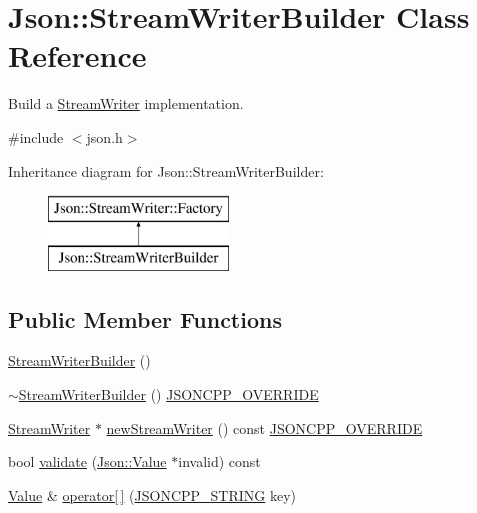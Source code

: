 \hypertarget{classJson_1_1StreamWriterBuilder}{}\section{Json\+:\+:Stream\+Writer\+Builder Class Reference}
\label{classJson_1_1StreamWriterBuilder}


Build a \hyperlink{classJson_1_1StreamWriter}{Stream\+Writer} implementation.  




{\ttfamily \#include $<$json.\+h$>$}

Inheritance diagram for Json\+:\+:Stream\+Writer\+Builder\+:\begin{figure}[H]
\begin{center}
\leavevmode
\includegraphics[height=2.000000cm]{classJson_1_1StreamWriterBuilder}
\end{center}
\end{figure}
\subsection*{Public Member Functions}
\begin{DoxyCompactItemize}
\item 
\hyperlink{classJson_1_1StreamWriterBuilder_ab95b76179c152673ad14abc639a46ee4_ab95b76179c152673ad14abc639a46ee4}{Stream\+Writer\+Builder} ()
\item 
\hyperlink{classJson_1_1StreamWriterBuilder_a93263f8ef1e2d22593907075d8f0aaef_a93263f8ef1e2d22593907075d8f0aaef}{$\sim$\+Stream\+Writer\+Builder} () \hyperlink{json_8h_a824d6199c91488107e443226fa6022c5_a824d6199c91488107e443226fa6022c5}{J\+S\+O\+N\+C\+P\+P\+\_\+\+O\+V\+E\+R\+R\+I\+DE}
\item 
\hyperlink{classJson_1_1StreamWriter}{Stream\+Writer} $\ast$ \hyperlink{classJson_1_1StreamWriterBuilder_ab9ee278609f88ae04a7c1a84e1f559e6_ab9ee278609f88ae04a7c1a84e1f559e6}{new\+Stream\+Writer} () const \hyperlink{json_8h_a824d6199c91488107e443226fa6022c5_a824d6199c91488107e443226fa6022c5}{J\+S\+O\+N\+C\+P\+P\+\_\+\+O\+V\+E\+R\+R\+I\+DE}
\item 
bool \hyperlink{classJson_1_1StreamWriterBuilder_a12353b97766841db7d049da84658da09_a12353b97766841db7d049da84658da09}{validate} (\hyperlink{classJson_1_1Value}{Json\+::\+Value} $\ast$invalid) const
\item 
\hyperlink{classJson_1_1Value}{Value} \& \hyperlink{classJson_1_1StreamWriterBuilder_af68f6b59cb20b074052ed12bb3d336a3_af68f6b59cb20b074052ed12bb3d336a3}{operator\mbox{[}$\,$\mbox{]}} (\hyperlink{json_8h_a1e723f95759de062585bc4a8fd3fa4be_a1e723f95759de062585bc4a8fd3fa4be}{J\+S\+O\+N\+C\+P\+P\+\_\+\+S\+T\+R\+I\+NG} key)
\end{DoxyCompactItemize}

